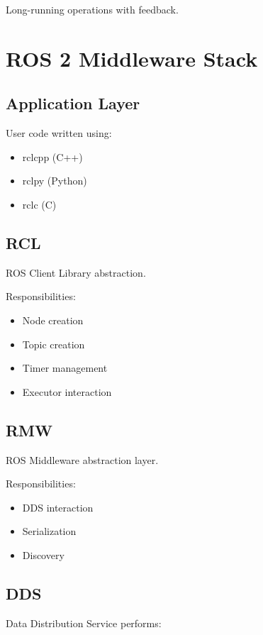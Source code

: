 \documentclass[11pt]{article}
\begin{document}
Long-running operations with feedback.

\section{ROS 2 Middleware Stack}

\subsection{Application Layer}

User code written using:

\begin{itemize}
\item rclcpp (C++)
\item rclpy (Python)
\item rclc (C)
\end{itemize}

\subsection{RCL}

ROS Client Library abstraction.

Responsibilities:

\begin{itemize}
\item Node creation
\item Topic creation
\item Timer management
\item Executor interaction
\end{itemize}

\subsection{RMW}

ROS Middleware abstraction layer.

Responsibilities:

\begin{itemize}
\item DDS interaction
\item Serialization
\item Discovery
\end{itemize}

\subsection{DDS}

Data Distribution Service performs:
\end{document}
